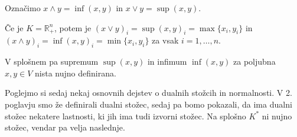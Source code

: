 \documentclass[mat2, tisk]{fmfdelo}
\begin{document}
Označimo $x\wedge y=\inf(x,y)$ in $x\vee y=\sup(x,y)$.

\begin{zgled}
  Če je $K=\mathbb{R}^n_+$, potem je
  $(x\vee y)_i=\sup(x,y)_i=\max\{x_i,y_i\}$ in $(x\wedge y)_i=\inf(x,y)_i=\min\{x_i,y_i\}$ za vsak $i = 1,\ldots,n$.
\end{zgled}

V splošnem pa supremum $\sup(x,y)$ in infimum $\inf(x,y)$ za poljubna $x,y \in V$ 
nista nujno definirana. 

Poglejmo si sedaj nekaj osnovnih dejstev o dualnih stožcih in normalnosti. V 2. poglavju smo že 
definirali dualni stožec, sedaj pa bomo pokazali, da ima dualni stožec nekatere lastnosti, ki 
jih ima tudi izvorni stožec.
Na splošno $K^{*}$ ni nujno stožec, vendar pa velja naslednje.
\end{document}
